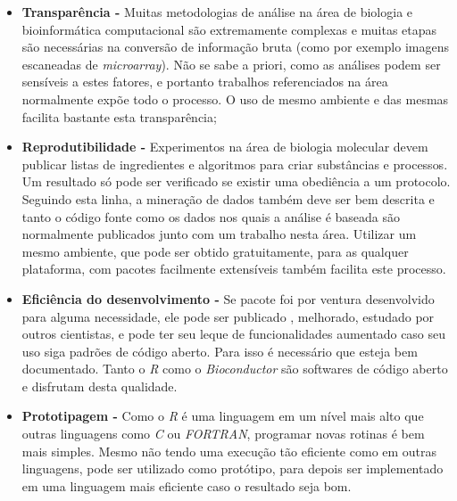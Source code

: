 \begin{itemize}
  \item \textbf{Transparência -} Muitas metodologias de análise na área de biologia e bioinformática computacional
são extremamente complexas e muitas etapas são necessárias na conversão de informação bruta (como por exemplo imagens 
escaneadas de \emph{microarray}). Não se sabe a priori, como as análises podem ser sensíveis a estes fatores, e portanto
trabalhos referenciados na área normalmente expõe todo o processo. O uso de mesmo ambiente e das mesmas facilita bastante
esta transparência;
  \item \textbf{Reprodutibilidade -} Experimentos na área de biologia molecular devem publicar listas de ingredientes
e algoritmos para criar substâncias e processos. Um resultado só pode ser verificado se existir uma obediência a 
um protocolo. Seguindo esta linha, a mineração de dados também deve ser bem descrita e tanto o código fonte 
como os dados nos quais a análise é baseada são normalmente publicados junto com um trabalho nesta área. Utilizar
um mesmo ambiente, que pode ser obtido gratuitamente, para as qualquer plataforma, com pacotes 
facilmente extensíveis também facilita este processo.
  \item \textbf{Eficiência do desenvolvimento -} Se pacote foi por ventura desenvolvido para alguma necessidade, ele pode ser publicado
, melhorado, estudado por outros cientistas, e pode ter seu leque de funcionalidades aumentado caso seu uso siga padrões
de código aberto. Para isso é necessário que esteja bem documentado. Tanto o \emph{R} como o \emph{Bioconductor} são softwares
de código aberto e disfrutam desta qualidade.
  \item \textbf{Prototipagem -} Como o \emph{R} é uma linguagem em um nível mais alto que outras linguagens como \emph{C} ou
\emph{FORTRAN}, programar novas rotinas é bem mais simples. Mesmo não tendo uma execução tão eficiente como em outras
linguagens, pode ser utilizado como protótipo, para depois ser implementado em uma linguagem mais eficiente caso o 
resultado seja bom. 

\end{itemize}
